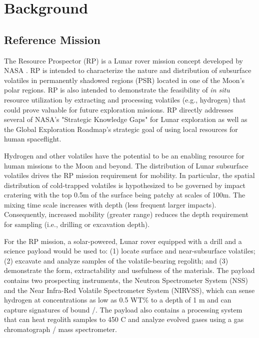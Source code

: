\documentclass[twocolumn,letterpaper]{IEEEAerospaceCLS}  %
\begin{document}
\section{Background}
\label{sec:background}

\subsection{Reference Mission}
The Resource Prospector (RP) is a Lunar rover mission concept developed by NASA \cite{andrews2015resource,colaprete2015resource}. RP is intended to characterize the nature and distribution of subsurface volatiles in permanently shadowed regions (PSR) located in one of the Moon's polar regions. RP is also intended to demonstrate the feasibility of \emph{in situ} resource utilization by extracting and processing volatiles (e.g., hydrogen) that could prove valuable for future exploration missions. RP directly addresses several of NASA's "Strategic Knowledge Gaps" for Lunar exploration as well as the Global Exploration Roadmap's strategic goal of using local resources for human spaceflight.

Hydrogen and other volatiles have the potential to be an enabling resource for human missions to the Moon and beyond. 
The distribution of Lunar subsurface volatiles drives the RP mission requirement for mobility. 
In particular, the spatial distribution of cold-trapped volatiles is hypothesized to be governed by impact cratering with the top 0.5m of the surface being patchy at scales of 100m. 
The mixing time scale increases with depth (less frequent larger impacts). 
Consequently, increased mobility (greater range) reduces the depth requirement for sampling (i.e., drilling or excavation depth). 

For the RP mission, a solar-powered, Lunar rover equipped with a drill and a science payload would be used to: (1) locate surface and near-subsurface volatiles; (2) excavate and analyze samples of the volatile-bearing regolith; and (3) demonstrate the form, extractability and usefulness of the materials. The payload contains two prospecting instruments, the Neutron Spectrometer System (NSS) and the Near Infra-Red Volatile Spectrometer System (NIRVSS), which can sense hydrogen at concentrations as low as 0.5 WT\% to a depth of 1 m and can capture signatures of bound /. The payload also contains a processing system that can heat regolith samples to 450 C and analyze evolved gases using a gas chromatograph / mass spectrometer.
\end{document}
